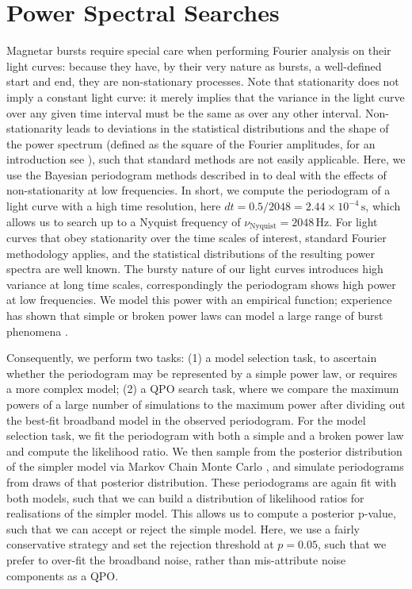 \documentclass[numberedappendix]{emulateapj}
\begin{document}
\section{Power Spectral Searches}
\label{sec:analysis}

Magnetar bursts require special care when performing Fourier analysis on their light curves: because they have, by their very nature as bursts, a well-defined start and end, they are non-stationary processes. Note that stationarity does not imply a constant light curve: it merely implies that the variance in the light curve over any given time interval must be the same as over any other interval. Non-stationarity leads to deviations in the statistical distributions and the shape of the power spectrum (defined as the square of the Fourier amplitudes, for an introduction see \citealp{vanderklis1989}), such that standard methods are not easily applicable.
Here, we use the Bayesian periodogram methods described in \citet{huppenkothen2013} to deal with the effects of non-stationarity at low frequencies. In short, we compute the periodogram of a light curve with a high time resolution, here $dt = 0.5/2048 = 2.44 \times 10^{-4} \, \mathrm{s}$, which allows us to search up to a Nyquist frequency of $\nu_{\mathrm{Nyquist}} = 2048 \, \mathrm{Hz}$. For light curves that obey stationarity over the time scales of interest, standard Fourier methodology applies, and the statistical distributions of the resulting power spectra are well known. The bursty nature of our light curves introduces high variance at long time scales, correspondingly the periodogram shows high power at low frequencies. We model this power with an empirical function; experience has shown that simple or broken power laws can model a large range of burst phenomena \citep{huppenkothen2013}. 

Consequently, we perform two tasks: (1) a model selection task, to ascertain whether the periodogram may be represented by a simple power law, or requires a more complex model; (2) a QPO search task, where we compare the maximum powers of a large number of simulations to the maximum power after dividing out the best-fit broadband model in the observed periodogram. For the model selection task, we fit the periodogram with both a simple and a broken power law and compute the likelihood ratio. We then sample from the posterior distribution of the simpler model via Markov Chain Monte Carlo \citep[using the freely available {\it python} code {\it emcee},][]{foreman2013}, and simulate periodograms from draws of that posterior distribution. These periodograms are again fit with both models, such that we can build a distribution of likelihood ratios for realisations of the simpler model. This allows us to compute a posterior p-value, such that we can accept or reject the simple model. Here, we use a fairly conservative strategy and set the rejection threshold at $p = 0.05$, such that we prefer to over-fit the broadband noise, rather than mis-attribute noise components as a QPO.
\end{document}
